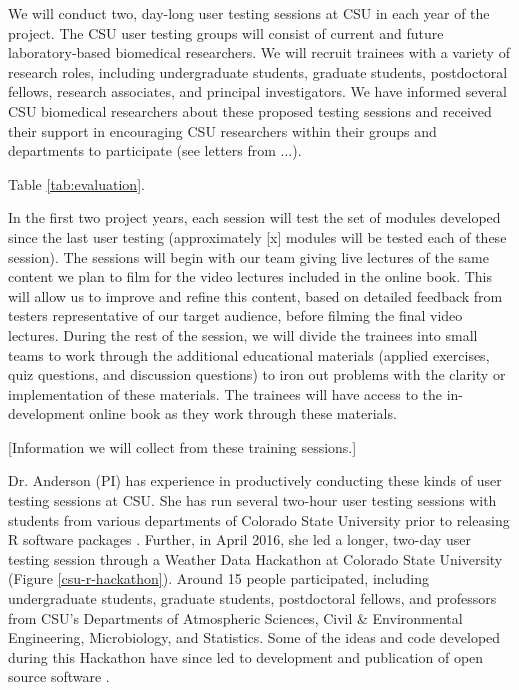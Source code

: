 \documentclass[pdftex,english,11pt,parskip=half]{scrartcl}
\begin{document}
We will conduct two, day-long user testing sessions at CSU in each year of the project. The CSU user testing groups will consist of current and future laboratory-based biomedical researchers. We will recruit trainees with a variety of research roles, including undergraduate students, graduate students, postdoctoral fellows, research associates, and principal investigators. We have informed several CSU biomedical researchers about these proposed testing sessions and received their support in encouraging CSU researchers within their groups and departments to participate (see letters from ...). 

Table \ref{tab:evaluation}.

In the first two project years, each session will test the set of modules developed since the last user testing (approximately [x] modules will be tested each of these session). The sessions will begin with our team giving live lectures of the same content we plan to film for the video lectures included in the online book. This will allow us to improve and refine this content, based on detailed feedback from testers representative of our target audience, before filming the final video lectures. During the rest of the session, we will divide the trainees into small teams to work through the additional educational materials (applied exercises, quiz questions, and discussion questions) to iron out problems with the clarity or implementation of these materials. The trainees will have access to the in-development online book as they work through these materials.

[Information we will collect from these training sessions.]

Dr. Anderson (PI) has experience in productively conducting these kinds of user testing sessions at CSU. She has run several two-hour user testing sessions with students from various departments of Colorado State University prior to releasing R software packages \cite{futureheatwaves, countyweather}. Further, in April 2016, she led a longer, two-day user testing session through a Weather Data Hackathon at Colorado State University (Figure \ref{csu-r-hackathon}). Around 15 people participated, including undergraduate students, graduate students, postdoctoral fellows, and professors from CSU's Departments of Atmospheric Sciences, Civil \& Environmental Engineering, Microbiology, and Statistics. Some of the ideas and code developed during this Hackathon have since led to development and publication of open source software \cite{countyfloods, noaastormevents}.
\end{document}
